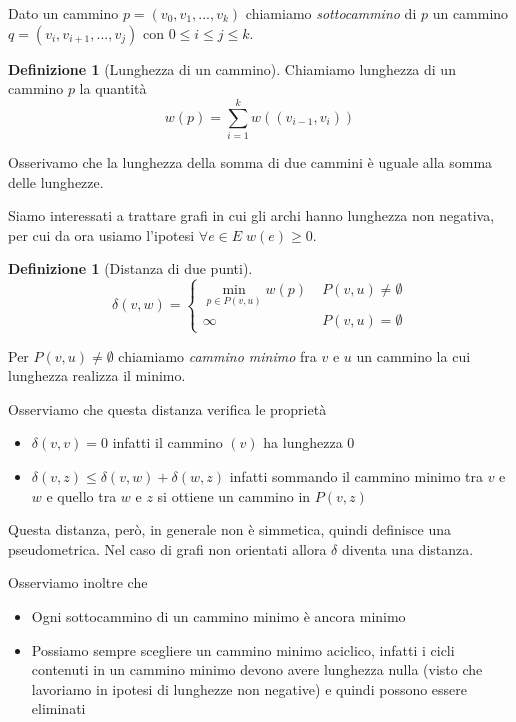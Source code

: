 \documentclass[a4paper,10pt]{amsbook}
\newcounter{counter1}
\theoremstyle{plain}
\theoremstyle{definition}
\newtheorem{mydef}[counter1]{Definizione}
\theoremstyle{remark}
\newcommand{\pa}[1]{\left(#1\right)}
\begin{document}
Dato un cammino $p = ( v_0, v_1, ..., v_k)$ chiamiamo
\textit{sottocammino} di $p$ un cammino $q = ( v_i , v_{i+1}, ... ,
v_j )$ con $0 \le i \le j \le k$.

\begin{mydef}[Lunghezza di un cammino]
  Chiamiamo lunghezza di un cammino $p$ la quantità
  \[ w(p) = \sum _{i=1} ^k w \pa{ (v_{i-1}, v_i) } \]
\end{mydef}

Osserivamo che la lunghezza della somma di due cammini è uguale alla
somma delle lunghezze.

Siamo interessati a trattare grafi in cui gli archi hanno lunghezza
non negativa, per cui da ora usiamo l'ipotesi $\forall e \in E \; w(e)
\ge 0$.

\begin{mydef}[Distanza di due punti]
  \[ \delta(v,w) = \left\{
    \begin{matrix}
      \min \limits_{p \in P(v,u)} { w(p) } & \; P(v,u) \neq \emptyset \\
      \infty & \; P(v,u) = \emptyset
    \end{matrix}
    \right.
    \]
\end{mydef}

Per $P(v,u) \neq \emptyset$ chiamiamo \textit{cammino minimo} fra $v$
e $u$ un cammino la cui lunghezza realizza il minimo.

Osserviamo che questa distanza verifica le proprietà
\begin{itemize}
\item $\delta(v,v) = 0$ infatti il cammino $(v)$ ha lunghezza $0$
\item $\delta(v,z) \le \delta(v,w) + \delta(w,z)$ infatti sommando il
  cammino minimo tra $v$ e $w$ e quello tra $w$ e $z$ si ottiene un
  cammino in $P(v,z)$
\end{itemize}
Questa distanza, però, in generale non è simmetica, quindi definisce
una pseudometrica. Nel caso di grafi non orientati allora $\delta$
diventa una distanza.

Osserviamo inoltre che
\begin{itemize}
\item Ogni sottocammino di un cammino minimo è ancora minimo
\item Possiamo sempre scegliere un cammino minimo aciclico, infatti i
  cicli contenuti in un cammino minimo devono avere lunghezza nulla
  (visto che lavoriamo in ipotesi di lunghezze non negative) e quindi
  possono essere eliminati
\end{itemize}
\end{document}
